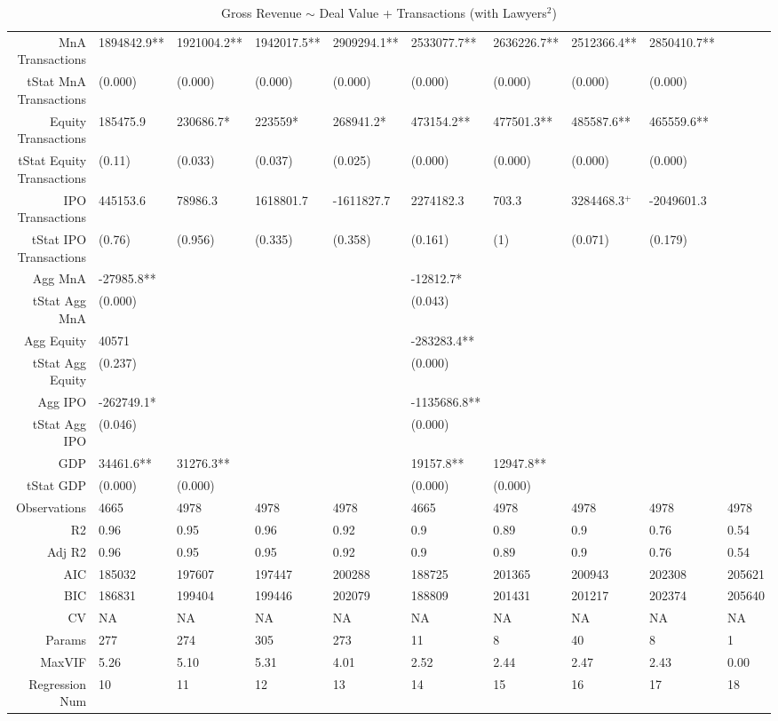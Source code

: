 \begin{table}[ht]
\begin{tabular}{rlllllllll}
  MnA Transactions & 1894842.9** & 1921004.2** & 1942017.5** & 2909294.1** & 2533077.7** & 2636226.7** & 2512366.4** & 2850410.7** &  \\ 
  tStat MnA Transactions & (0.000) & (0.000) & (0.000) & (0.000) & (0.000) & (0.000) & (0.000) & (0.000) &  \\ 
  Equity Transactions & 185475.9 & 230686.7* & 223559* & 268941.2* & 473154.2** & 477501.3** & 485587.6** & 465559.6** &  \\ 
  tStat Equity Transactions & (0.11) & (0.033) & (0.037) & (0.025) & (0.000) & (0.000) & (0.000) & (0.000) &  \\ 
  IPO Transactions & 445153.6 & 78986.3 & 1618801.7 & -1611827.7 & 2274182.3 & 703.3 & 3284468.3$^{+}$ & -2049601.3 &  \\ 
  tStat IPO Transactions & (0.76) & (0.956) & (0.335) & (0.358) & (0.161) & (1) & (0.071) & (0.179) &  \\ 
  Agg MnA & -27985.8** &  &  &  & -12812.7* &  &  &  &  \\ 
  tStat Agg MnA & (0.000) &  &  &  & (0.043) &  &  &  &  \\ 
  Agg Equity & 40571 &  &  &  & -283283.4** &  &  &  &  \\ 
  tStat Agg Equity & (0.237) &  &  &  & (0.000) &  &  &  &  \\ 
  Agg IPO & -262749.1* &  &  &  & -1135686.8** &  &  &  &  \\ 
  tStat Agg IPO & (0.046) &  &  &  & (0.000) &  &  &  &  \\ 
  GDP & 34461.6** & 31276.3** &  &  & 19157.8** & 12947.8** &  &  &  \\ 
  tStat GDP & (0.000) & (0.000) &  &  & (0.000) & (0.000) &  &  &  \\ 
  Observations & 4665 & 4978 & 4978 & 4978 & 4665 & 4978 & 4978 & 4978 & 4978 \\ 
  R2 & 0.96 & 0.95 & 0.96 & 0.92 & 0.9 & 0.89 & 0.9 & 0.76 & 0.54 \\ 
  Adj R2 & 0.96 & 0.95 & 0.95 & 0.92 & 0.9 & 0.89 & 0.9 & 0.76 & 0.54 \\ 
  AIC & 185032 & 197607 & 197447 & 200288 & 188725 & 201365 & 200943 & 202308 & 205621 \\ 
  BIC & 186831 & 199404 & 199446 & 202079 & 188809 & 201431 & 201217 & 202374 & 205640 \\ 
  CV & NA & NA & NA & NA & NA & NA & NA & NA & NA \\ 
  Params & 277 & 274 & 305 & 273 & 11 & 8 & 40 & 8 & 1 \\ 
  MaxVIF & 5.26 & 5.10 & 5.31 & 4.01 & 2.52 & 2.44 & 2.47 & 2.43 & 0.00 \\ 
  Regression Num & 10 & 11 & 12 & 13 & 14 & 15 & 16 & 17 & 18 \\ 
   \hline
\end{tabular}
\caption{Gross Revenue $\sim$ Deal Value + Transactions (with Lawyers$^2$)} 
\end{table}
